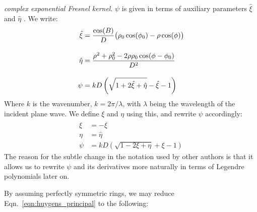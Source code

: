 \documentclass{article}
\theoremstyle{plain}
\begin{document}
        \textit{complex exponential Fresnel kernel}.
        $\psi$ is given in terms of auxiliary parameters
        $\hat{\xi}$ and $\hat{\eta}$ \cite[Eqn.~4a-4c]{MTR86}. We write:
        \begin{subequations}
            \begin{align}
                \hat{\xi}
                &=\frac{\cos(B)}{D}\big(
                    \rho_{0}\cos(\phi_{0})-\rho\cos(\phi)
                \big)\\[1em]
                \hat{\eta}
                &=\frac{%
                    \rho^{2}+\rho_{0}^{2}-2\rho\rho_{0}\cos(\phi-\phi_{0})%
                }{D^{2}}\\[1em]
                \psi
                &=kD\left(
                    \sqrt{1+2\hat{\xi}+\hat{\eta}}-\hat{\xi}-1
                \right)
            \end{align}
        \end{subequations}
        Where $k$ is the wavenumber, $k=2\pi/\lambda$, with $\lambda$ being
        the wavelength of the incident plane wave.
        We define $\xi$ and $\eta$ using this, and rewrite $\psi$ accordingly:
        \begin{subequations}
            \begin{align}
                \xi&=-\hat{\xi}\\
                \eta&=\hat{\eta}\\
                \label{eqn:fresnel_kernel_psi}
                \psi&=kD\left(
                    \sqrt{1-2\xi+\eta}+\xi-1
                \right)
            \end{align}
        \end{subequations}
        The reason for the subtle change in the notation used by other
        authors is that it allows us to rewrite $\psi$ and its derivatives
        more naturally in terms of Legendre polynomials later on.
        \par\hfill\par
        By assuming perfectly symmetric rings, we may reduce
        Eqn.~\ref{eqn:huygens_principal} to the following:
\end{document}
